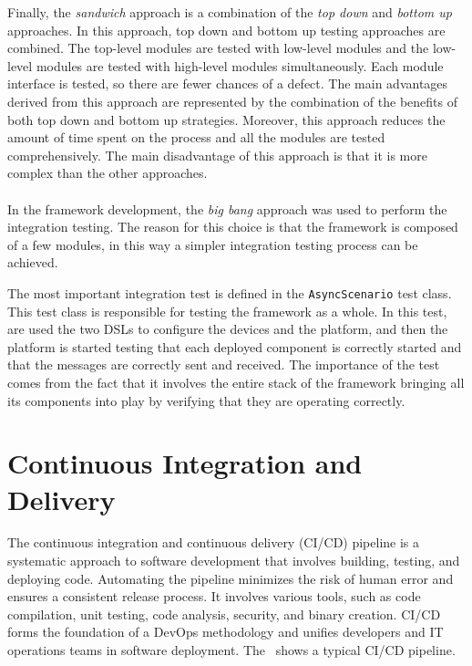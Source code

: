 Finally, the \emph{sandwich} approach is a combination of the \emph{top down} and \emph{bottom up} approaches. In this approach, top down and bottom
up testing approaches are combined. The top-level modules are tested with low-level modules and the low-level modules are tested with high-level
modules simultaneously. Each module interface is tested, so there are fewer chances of a defect.
The main advantages derived from this approach are represented by the combination of the benefits of both top down and bottom up strategies.
Moreover, this approach reduces the amount of time spent on the process and all the modules are tested comprehensively.
The main disadvantage of this approach is that it is more complex than the other approaches.

\paragraph*{}

In the framework development, the \emph{big bang} approach was used to perform the integration testing. The reason for this choice is that
the framework is composed of a few modules, in this way a simpler integration testing process can be achieved.

The most important integration test is defined in the \texttt{AsyncScenario} test class. This test class is responsible for testing the
framework as a whole. In this test, are used the two DSLs to configure the devices and the platform, and then the platform is started testing
that each deployed component is correctly started and that the messages are correctly sent and received.
The importance of the test comes from the fact that it involves the entire stack of the framework bringing all its components into play by verifying
that they are operating correctly.

\section{Continuous Integration and Delivery}
\label{sec:ci-cd}

The continuous integration and continuous delivery (CI/CD) pipeline is a systematic approach to software development that involves building, testing,
and deploying code. Automating the pipeline minimizes the risk of human error and ensures a consistent release process. It involves various tools,
such as code compilation, unit testing, code analysis, security, and binary creation.
CI/CD forms the foundation of a DevOps methodology and unifies developers and IT operations teams in software deployment.
The~ shows a typical CI/CD pipeline.

